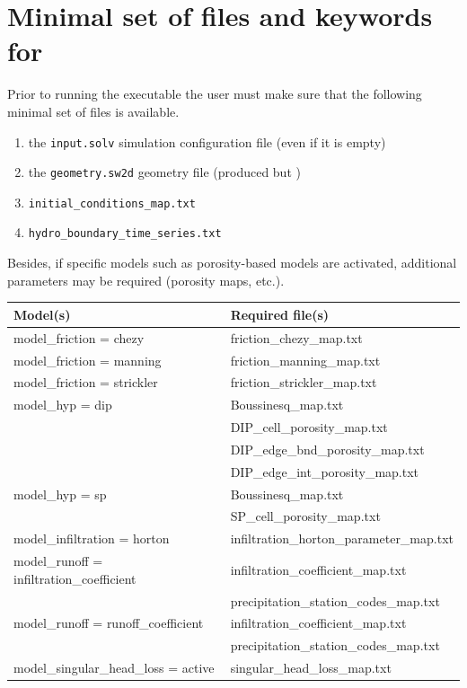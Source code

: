\section{Minimal set of files and keywords for \swSolver}
Prior to running the \swSolver executable the user must make sure that the following minimal set of files is available.

\begin{enumerate}
	\item the \texttt{input.solv} simulation configuration file  (even if it is empty)
	\item the \texttt{geometry.sw2d} geometry file (produced but \swConverter)
	\item \texttt{initial\_conditions\_map.txt}
	\item \texttt{hydro\_boundary\_time\_series.txt}
\end{enumerate}
Besides, if specific models such as porosity-based models are activated, additional parameters may be required (porosity maps, etc.).
\begin{table}[H]
\begin{tabular}{p{7cm}| p{8cm}}
\hline
Model(s) & Required file(s) \\
\hline
model\_friction = chezy & friction\_chezy\_map.txt \\
\hline
model\_friction = manning & friction\_manning\_map.txt \\
\hline
model\_friction = strickler & friction\_strickler\_map.txt \\
\hline
model\_hyp = dip & Boussinesq\_map.txt \\
                 & DIP\_cell\_porosity\_map.txt \\
                 & DIP\_edge\_bnd\_porosity\_map.txt \\
                 & DIP\_edge\_int\_porosity\_map.txt \\
\hline
model\_hyp = sp & Boussinesq\_map.txt \\
                & SP\_cell\_porosity\_map.txt \\
\hline
model\_infiltration = horton & infiltration\_horton\_parameter\_map.txt \\
\hline
model\_runoff = infiltration\_coefficient & infiltration\_coefficient\_map.txt \\ 
      & precipitation\_station\_codes\_map.txt \\
\hline
model\_runoff = runoff\_coefficient & infiltration\_coefficient\_map.txt \\
                & precipitation\_station\_codes\_map.txt \\         
\hline
model\_singular\_head\_loss = active & singular\_head\_loss\_map.txt \\
\hline
\end{tabular}

\end{table}
